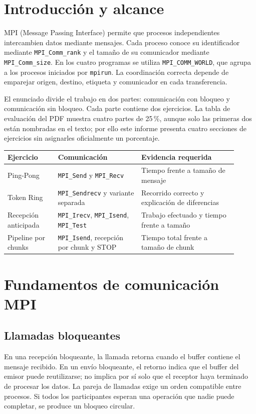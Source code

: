 \documentclass[11pt,letterpaper]{article}
\newcommand{\heading}[1]{\section{\textcolor{azul}{#1}}}
\newcommand{\subheading}[1]{\subsection{\textcolor{azul}{#1}}}
\begin{document}
{\small\setlength{\parskip}{0pt}\tableofcontents}
\newpage

\heading{Introducción y alcance}

MPI (Message Passing Interface) permite que procesos independientes
intercambien datos mediante mensajes. Cada proceso conoce su identificador
mediante \texttt{MPI\_Comm\_rank} y el tamaño de su comunicador mediante
\texttt{MPI\_Comm\_size}. En los cuatro programas se utiliza
\texttt{MPI\_COMM\_WORLD}, que agrupa a los procesos iniciados por
\texttt{mpirun}. La coordinación correcta depende de emparejar origen,
destino, etiqueta y comunicador en cada transferencia.

El enunciado divide el trabajo en dos partes: comunicación con bloqueo y
comunicación sin bloqueo. Cada parte contiene dos ejercicios. La tabla de
evaluación del PDF muestra cuatro partes de 25\,\%, aunque solo las primeras
dos están nombradas en el texto; por ello este informe presenta cuatro
secciones de ejercicios sin asignarles oficialmente un porcentaje.

\begin{center}
\begin{tabular}{@{}L{0.20\linewidth}L{0.33\linewidth}L{0.38\linewidth}@{}}
\toprule
\textbf{Ejercicio} & \textbf{Comunicación} & \textbf{Evidencia requerida} \\
\midrule
Ping-Pong & \texttt{MPI\_Send} y \texttt{MPI\_Recv} & Tiempo frente a tamaño de mensaje \\
Token Ring & \texttt{MPI\_Sendrecv} y variante separada & Recorrido correcto y explicación de diferencias \\
Recepción anticipada & \texttt{MPI\_Irecv}, \texttt{MPI\_Isend}, \texttt{MPI\_Test} & Trabajo efectuado y tiempo frente a tamaño \\
Pipeline por chunks & \texttt{MPI\_Isend}, recepción por chunk y STOP & Tiempo total frente a tamaño de chunk \\
\bottomrule
\end{tabular}
\end{center}

\heading{Fundamentos de comunicación MPI}

\subheading{Llamadas bloqueantes}

En una recepción bloqueante, la llamada retorna cuando el buffer contiene
el mensaje recibido. En un envío bloqueante, el retorno indica que el
buffer del emisor puede reutilizarse; no implica por sí solo que el receptor
haya terminado de procesar los datos. La pareja de llamadas exige un orden
compatible entre procesos. Si todos los participantes esperan una
operación que nadie puede completar, se produce un bloqueo circular.
\end{document}
